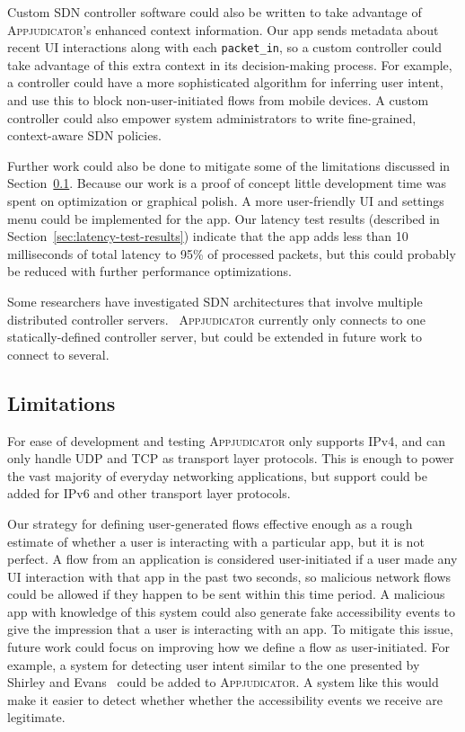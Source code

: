 Custom SDN controller software could also be written to take advantage of
\textsc{Appjudicator}'s enhanced context information. Our app sends metadata
about recent UI interactions along with each \texttt{packet\_in}, so a custom
controller could take advantage of this extra context in its decision-making
process. For example, a controller could have a more sophisticated algorithm for
inferring user intent, and use this to block non-user-initiated flows from
mobile devices. A custom controller could also empower system administrators to
write fine-grained, context-aware SDN policies. 

Further work could also be done to mitigate some of the limitations discussed in
Section~\ref{sec:limitations}. Because our work is a proof of concept little
development time was spent on optimization or graphical polish. A more
user-friendly UI and settings menu could be implemented for the app. Our latency
test results (described in Section~\ref{sec:latency-test-results}) indicate that
the app adds less than 10 milliseconds of total latency to 95\% of processed
packets, but this could probably be reduced with further performance
optimizations.

Some researchers have investigated SDN architectures that involve multiple
distributed controller servers.~\cite{dixit2013, oktian2017}
\textsc{Appjudicator} currently only connects to one statically-defined
controller server, but could be extended in future work to connect to several.

\subsection{Limitations}
\label{sec:limitations}

For ease of development and testing \textsc{Appjudicator} only supports IPv4,
and can only handle UDP and TCP as transport layer protocols. This is enough to
power the vast majority of everyday networking applications, but support could
be added for IPv6 and other transport layer protocols.

Our strategy for defining user-generated flows effective enough as a rough
estimate of whether a user is interacting with a particular app, but it is not
perfect. A flow from an application is considered user-initiated if a user made
any UI interaction with that app in the past two seconds, so malicious network
flows could be allowed if they happen to be sent within this time period. A
malicious app with knowledge of this system could also generate fake
accessibility events to give the impression that a user is interacting with an
app. To mitigate this issue, future work could focus on improving how we define
a flow as user-initiated. For example, a system for detecting user intent
similar to the one presented by Shirley and Evans~\cite{shirley2008} could be
added to \textsc{Appjudicator}. A system like this would make it easier to
detect whether whether the accessibility events we receive are legitimate.

